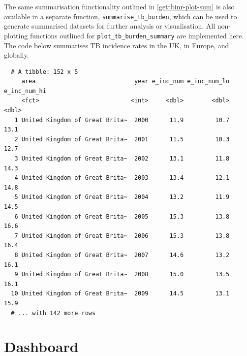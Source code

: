 \documentclass[11pt,twoside]{bristolthesis}
\begin{document}
  The same summarisation functionality outlined in \ref{gettbinr-plot-sum} is also available in a separate function, \texttt{summarise\_tb\_burden}, which can be used to generate summarised datasets for further analysis or visualisation. All non-plotting functions outlined for \texttt{plot\_tb\_burden\_summary} are implemented here. The code below summarises TB incidence rates in the UK, in Europe, and globally.
  \begin{Shaded}
  \begin{Highlighting}[]
  \NormalTok{(} \NormalTok{,}
                        \NormalTok{,}
                        \NormalTok{, }
                        \NormalTok{, }
                        \NormalTok{,}
                        \NormalTok{)}
  \end{Highlighting}
  \end{Shaded}
  \begin{verbatim}
  # A tibble: 152 x 5
     area                            year e_inc_num e_inc_num_lo e_inc_num_hi
     <fct>                          <int>     <dbl>        <dbl>        <dbl>
   1 United Kingdom of Great Brita~  2000      11.9         10.7         13.1
   2 United Kingdom of Great Brita~  2001      11.5         10.3         12.7
   3 United Kingdom of Great Brita~  2002      13.1         11.8         14.3
   4 United Kingdom of Great Brita~  2003      13.4         12.1         14.8
   5 United Kingdom of Great Brita~  2004      13.2         11.9         14.5
   6 United Kingdom of Great Brita~  2005      15.3         13.8         16.6
   7 United Kingdom of Great Brita~  2006      15.3         13.8         16.4
   8 United Kingdom of Great Brita~  2007      14.6         13.2         16.1
   9 United Kingdom of Great Brita~  2008      15.0         13.5         16.1
  10 United Kingdom of Great Brita~  2009      14.5         13.1         15.9
  # ... with 142 more rows
  \end{verbatim}
  \hypertarget{dashboard}{%
  \section{Dashboard}\label{dashboard}}
  
\end{document}

